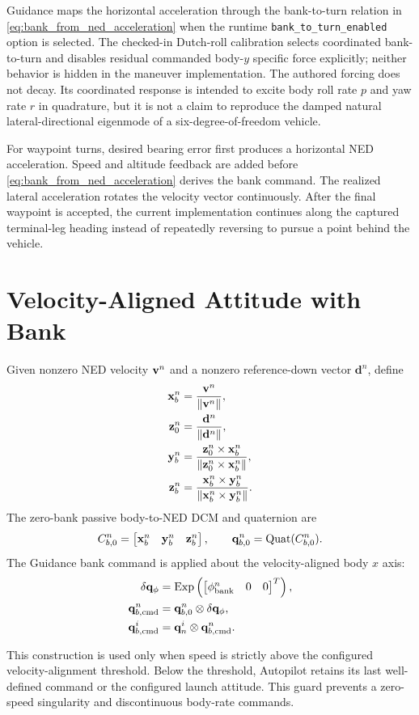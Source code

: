 Guidance maps the horizontal acceleration through the bank-to-turn relation in
\cref{eq:bank_from_ned_acceleration} when the runtime
\texttt{bank\_to\_turn\_enabled} option is selected. The checked-in
Dutch-roll calibration selects coordinated bank-to-turn and disables residual
commanded body-$y$ specific force explicitly; neither behavior is hidden in
the maneuver implementation. The authored forcing does not decay. Its
coordinated response is intended to excite body roll rate \(p\) and yaw rate
\(r\) in quadrature, but it is not a claim to reproduce the damped natural
lateral-directional eigenmode of a six-degree-of-freedom vehicle.

For waypoint turns, desired bearing error first produces a horizontal NED
acceleration. Speed and altitude feedback are added before
\cref{eq:bank_from_ned_acceleration} derives the bank command. The realized
lateral acceleration rotates the velocity vector continuously. After the
final waypoint is accepted, the current implementation continues along the
captured terminal-leg heading instead of repeatedly reversing to pursue a
point behind the vehicle.

\section{Velocity-Aligned Attitude with Bank}

Given nonzero NED velocity $\mathbf{v}^{n}$ and a nonzero reference-down vector
$\mathbf{d}^{n}$, define
\begin{align}
\mathbf{x}_{b}^{n}
&=\frac{\mathbf{v}^{n}}{\left\lVert \mathbf{v}^{n} \right\rVert},
\label{eq:velocity_forward}\\
\mathbf{z}_{0}^{n}
&=\frac{\mathbf{d}^{n}}{\left\lVert \mathbf{d}^{n} \right\rVert},\\
\mathbf{y}_{b}^{n}
&=\frac{\mathbf{z}_{0}^{n}\times\mathbf{x}_{b}^{n}}
        {\left\lVert \mathbf{z}_{0}^{n}\times\mathbf{x}_{b}^{n} \right\rVert},
\label{eq:velocity_right}\\
\mathbf{z}_{b}^{n}
&=\frac{\mathbf{x}_{b}^{n}\times\mathbf{y}_{b}^{n}}
        {\left\lVert \mathbf{x}_{b}^{n}\times\mathbf{y}_{b}^{n} \right\rVert}.
\label{eq:velocity_down}
\end{align}
The zero-bank passive body-to-NED DCM and quaternion are
\begin{equation}
C_{b,0}^{n}
=
\begin{bmatrix}
\mathbf{x}_{b}^{n} & \mathbf{y}_{b}^{n} & \mathbf{z}_{b}^{n}
\end{bmatrix},
\qquad
\mathbf{q}_{b,0}^{n}=\operatorname{Quat}(C_{b,0}^{n}).
\label{eq:velocity_attitude}
\end{equation}
The Guidance bank command is applied about the velocity-aligned body
$x$ axis:
\begin{align}
\delta\mathbf{q}_{\phi}
&=\operatorname{Exp}
\left(
\begin{bmatrix}
\phi_{\mathrm{bank}}^{n}&0&0
\end{bmatrix}^{T}
\right),\\
\mathbf{q}_{b,\mathrm{cmd}}^{n}
&=\mathbf{q}_{b,0}^{n}\otimes\delta\mathbf{q}_{\phi},\\
\mathbf{q}_{b,\mathrm{cmd}}^{i}
&=\mathbf{q}_n^i\otimes\mathbf{q}_{b,\mathrm{cmd}}^{n}.
\label{eq:banked_velocity_attitude}
\end{align}

This construction is used only when speed is strictly above the configured
velocity-alignment threshold. Below the threshold, Autopilot retains its
last well-defined command or the configured launch attitude. This guard
prevents a zero-speed singularity and discontinuous body-rate commands.
